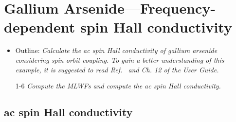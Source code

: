 \section{Gallium Arsenide---Frequency-dependent spin Hall conductivity}
\label{sec30:GaAsSHC}

\begin{itemize}
	\item Outline: {\it Calculate the ac spin Hall conductivity
	of gallium arsenide considering spin-orbit coupling. To gain a better understanding of this example, it is suggested to read Ref.~ and Ch. 12 of the User Guide.}
\end{itemize}

\begin{itemize}
	\item[1-6] {\it Compute the MLWFs and compute the ac spin Hall conductivity.} 
\end{itemize}

\subsection*{ac spin Hall conductivity}

